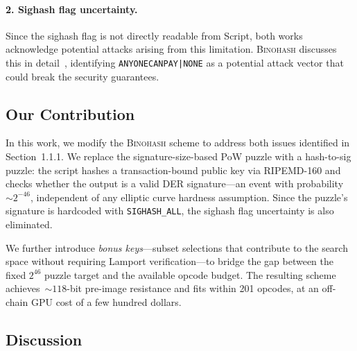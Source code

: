 \documentclass[11pt, a4paper]{article}
\begin{document}
\paragraph{2. Sighash flag uncertainty.}
Since the sighash flag is not directly readable from Script, both works acknowledge potential attacks arising from this limitation. \textsc{Binohash} discusses this in detail~\cite[Section~7.1]{linus2024binohash}, identifying \texttt{ANYONECANPAY|NONE} as a potential attack vector that could break the security guarantees.

\subsection{Our Contribution}
\label{sec:contribution}

In this work, we modify the \textsc{Binohash} scheme to address both issues identified in Section~1.1.1. We replace the signature-size-based PoW puzzle with a hash-to-sig puzzle: the script hashes a transaction-bound public key via RIPEMD-160 and checks whether the output is a valid DER signature---an event with probability~${\sim}2^{-46}$, independent of any elliptic curve hardness assumption. Since the puzzle's signature is hardcoded with \texttt{SIGHASH\_ALL}, the sighash flag uncertainty is also eliminated.

We further introduce \emph{bonus keys}---subset selections that contribute to the search space without requiring Lamport verification---to bridge the gap between the fixed $2^{46}$ puzzle target and the available opcode budget. The resulting scheme achieves~${\sim}118$-bit pre-image resistance and fits within 201 opcodes, at an off-chain GPU cost of a few hundred dollars.

\subsection{Discussion}
\end{document}
